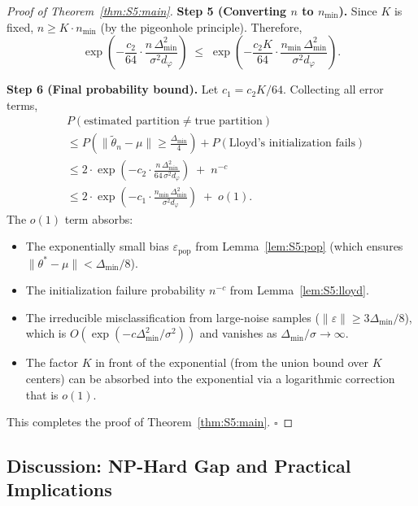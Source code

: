 \documentclass[twoside]{article}
\theoremstyle{plain}
\theoremstyle{definition}
\theoremstyle{remark}
\newcommand{\1}{\mathbf{1}}
\renewcommand{\epsilon}{\varepsilon}
\renewcommand{\phi}{\varphi}
\newcommand{\ttheta}{\tilde{\theta}}
\newcommand{\norm}[1]{\lVert#1\rVert}
\begin{document}
\begin{proof}[Proof of Theorem~\ref{thm:S5:main}]
\noindent\textbf{Step 5 (Converting $n$ to $n_{\min}$).}
Since $K$ is fixed, $n\ge K\cdot n_{\min}$ (by the pigeonhole principle).
Therefore,
\[
\exp\!\left(-\frac{c_2}{64}\cdot\frac{n\,\Delta_{\min}^2}{\sigma^2 d_\phi}\right)
\;\le\; \exp\!\left(-\frac{c_2 K}{64}\cdot
              \frac{n_{\min}\,\Delta_{\min}^2}{\sigma^2 d_\phi}\right).
\]

\noindent\textbf{Step 6 (Final probability bound).}
Let $c_1 = c_2 K / 64$.  Collecting all error terms,
\begin{align*}
&P(\text{estimated partition}\neq\text{true partition}) \\
&\le P\!\left(\norm{\ttheta_n-\mu}\ge\frac{\Delta_{\min}}{4}\right)
   + P(\text{Lloyd's initialization fails}) \\
&\le 2\cdot\exp\!\left(-c_2\cdot\frac{n\,\Delta_{\min}^2}{64\,\sigma^2 d_\phi}\right)
   \;+\; n^{-c} \\
&\le 2\cdot\exp\!\left(-c_1\cdot\frac{n_{\min}\,\Delta_{\min}^2}
                                {\sigma^2 d_\phi}\right)
   \;+\; o(1).
\end{align*}
The $o(1)$ term absorbs:
\begin{itemize}
\item The exponentially small bias $\epsilon_{\mathrm{pop}}$ from
Lemma~\ref{lem:S5:pop} (which ensures
$\norm{\theta^*-\mu}<\Delta_{\min}/8$).
\item The initialization failure probability $n^{-c}$ from
Lemma~\ref{lem:S5:lloyd}.
\item The irreducible misclassification from large-noise samples
($\norm{\varepsilon}\ge3\Delta_{\min}/8$), which is
$O(\exp(-c\Delta_{\min}^2/\sigma^2))$ and vanishes as
$\Delta_{\min}/\sigma\to\infty$.
\item The factor $K$ in front of the exponential (from the union bound
over $K$ centers) can be absorbed into the exponential via a
logarithmic correction that is $o(1)$.
\end{itemize}
This completes the proof of Theorem~\ref{thm:S5:main}.  \hfill$\square$
\end{proof}

\subsection{Discussion: NP-Hard Gap and Practical Implications}
\label{sec:S5:disc}
\end{document}
